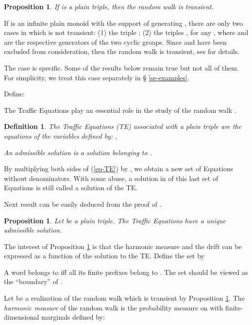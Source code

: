 \documentclass[11pt,a4paper]{article}
\newtheorem{proposition}[theorem]{Proposition}
\newtheorem{definition}[theorem]{Definition}
\theoremstyle{remark}
\def\eref#1{(\ref{#1})}
\begin{document}
\begin{proposition}\label{pr-transient}
If  is a plain triple, then the random walk
 is transient.
\end{proposition}

If  is an infinite plain monoid with the support of 
generating , there are only two cases in
which  is not transient: (1) the triple ; (2) the triples , for any , where  and  are the respective
generators of the two cyclic groups. Since  and  have been excluded from consideration, then the random
walk  is transient, see \cite{mair04} for details.


The case  is specific. Some of the results below remain true
but not all of them. For simplicity, we treat this case separately in \S
\ref{se-examples}.

\medskip

Define:


The Traffic Equations play an essential role in the study of the
random walk .

\begin{definition}\label{de-TE}
The {\em Traffic Equations (TE)} associated with a plain triple
 are the equations of the variables  defined by: ,

An {\em admissible solution} is a solution belonging to  .
\end{definition}

By multiplying both sides of \eref{eq-TE} by ,
we obtain a new set of Equations without denominators. With some
abuse, a solution  in  of this last set of Equations
is still called a solution of the TE.

Next result can be easily deduced from the proof of \cite[Theorem
  4.5]{mair04}.

\begin{proposition}\label{pr-solTE}
Let  be a plain triple. The Traffic Equations have
a unique admissible solution.
\end{proposition}


The interest of Proposition \ref{pr-solTE} is that the harmonic
measure and the drift can be expressed as a function of the
solution to the TE.
Define the set
 by

A word belongs to  iff all its finite prefixes belong to
. The set  should be viewed as the
``boundary'' of .

\medskip

Let  be a
realization of the random walk which is transient by Proposition
\ref{pr-transient}. 
The {\em harmonic measure} of the random walk is the probability
measure  on  with finite-dimensional marginals defined by:
\end{document}
